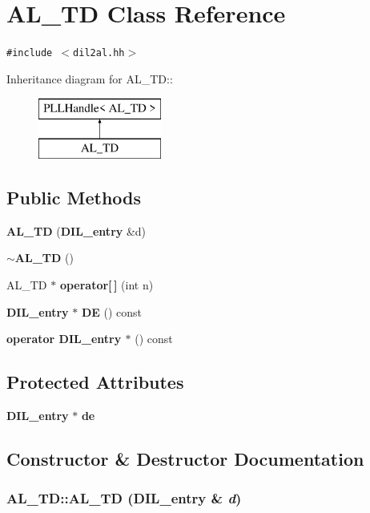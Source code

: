 \section{AL\_\-TD  Class Reference}
\label{classAL__TD}
{\tt \#include $<$dil2al.hh$>$}

Inheritance diagram for AL\_\-TD::\begin{figure}[H]
\begin{center}
\leavevmode
\includegraphics[height=2cm]{classAL__TD}
\end{center}
\end{figure}
\subsection*{Public Methods}
\begin{CompactItemize}
\item 
{\bf AL\_\-TD} ({\bf DIL\_\-entry} \&d)
\item 
{\bf $\sim$AL\_\-TD} ()
\item 
AL\_\-TD $\ast$ {\bf operator[$\,$]} (int n)
\item 
{\bf DIL\_\-entry} $\ast$ {\bf DE} () const
\item 
{\bf operator DIL\_\-entry $\ast$} () const
\end{CompactItemize}
\subsection*{Protected Attributes}
\begin{CompactItemize}
\item 
{\bf DIL\_\-entry} $\ast$ {\bf de}
\end{CompactItemize}


\subsection{Constructor \& Destructor Documentation}
\subsubsection{\setlength{\rightskip}{0pt plus 5cm}AL\_\-TD::AL\_\-TD ({\bf DIL\_\-entry} \& {\em d})\hspace{0.3cm}{\tt  [inline]}}\label{classAL__TD_a0}




